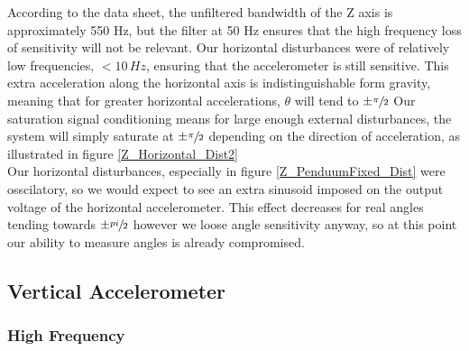 \documentclass{article}
\theoremstyle{plain}
\theoremstyle{definition}
\theoremstyle{remark}
\begin{document}


According to the data sheet, the unfiltered bandwidth of the Z axis is approximately 550 Hz, but the filter at 50 Hz ensures that the high frequency loss of sensitivity will not be relevant.  Our horizontal disturbances were of relatively low frequencies, $< 10 \, Hz$, ensuring that the accelerometer is still sensitive.  This extra acceleration along the horizontal axis is indistinguishable form gravity, meaning that for greater horizontal accelerations, $\theta$ will tend to $\pm \sfrac{\pi}{2}$ Our saturation signal conditioning means for large enough external disturbances, the system will simply saturate at $\pm \sfrac{\pi}{2}$ depending on the direction of acceleration, as illustrated in figure \ref{Z_Horizontal_Dist2} \\

Our horizontal disturbances, especially in figure \ref{Z_PenduumFixed_Dist} were osscilatory, so we would expect to see an extra sinusoid imposed on the output voltage of the horizontal accelerometer.  This effect decreases for real angles tending towards $\pm \sfrac{pi}{2}$ however we loose angle sensitivity anyway, so at this point our ability to measure angles is already compromised.  \\
\clearpage

\subsection{Vertical Accelerometer}
\subsubsection{High Frequency}
\end{document}
